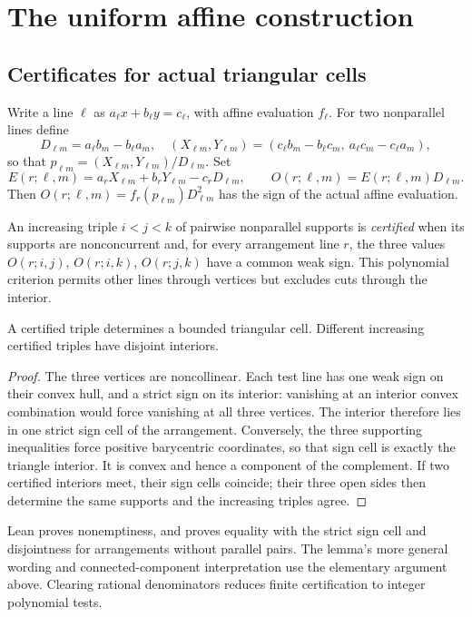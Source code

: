 \section{The uniform affine construction}\label{j:construction}

\subsection{Certificates for actual triangular cells}

Write a line $\ell$ as $a_\ell x+b_\ell y=c_\ell$, with affine evaluation $f_\ell$. For two nonparallel lines define
\[
 D_{\ell m}=a_\ell b_m-b_\ell a_m,\quad
 (X_{\ell m},Y_{\ell m})=(c_\ell b_m-b_\ell c_m,\ a_\ell c_m-c_\ell a_m),
\]
so that $p_{\ell m}=(X_{\ell m},Y_{\ell m})/D_{\ell m}$. Set
\[
 E(r;\ell,m)=a_rX_{\ell m}+b_rY_{\ell m}-c_rD_{\ell m},\qquad
 O(r;\ell,m)=E(r;\ell,m)D_{\ell m}.
\]
Then $O(r;\ell,m)=f_r(p_{\ell m})D_{\ell m}^2$ has the sign of the actual affine evaluation.

An increasing triple $i<j<k$ of pairwise nonparallel supports is \emph{certified} when its supports are nonconcurrent and, for every arrangement line $r$, the three values $O(r;i,j)$, $O(r;i,k)$, $O(r;j,k)$ have a common weak sign. This polynomial criterion permits other lines through vertices but excludes cuts through the interior.

\begin{lemma}\label{j:cell}
A certified triple determines a bounded triangular cell. Different increasing certified triples have disjoint interiors.
\end{lemma}
\begin{proof}
The three vertices are noncollinear. Each test line has one weak sign on their convex hull, and a strict sign on its interior: vanishing at an interior convex combination would force vanishing at all three vertices. The interior therefore lies in one strict sign cell of the arrangement. Conversely, the three supporting inequalities force positive barycentric coordinates, so that sign cell is exactly the triangle interior. It is convex and hence a component of the complement. If two certified interiors meet, their sign cells coincide; their three open sides then determine the same supports and the increasing triples agree.
\end{proof}

Lean proves nonemptiness, and proves equality with the strict sign cell and disjointness for arrangements without parallel pairs. The lemma's more general wording and connected-component interpretation use the elementary argument above. Clearing rational denominators reduces finite certification to integer polynomial tests.

